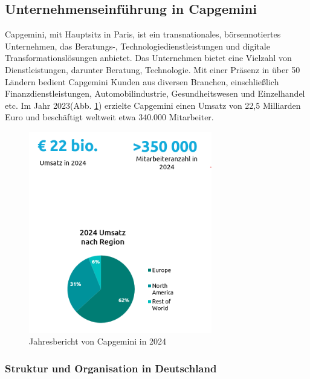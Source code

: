 \documentclass[a4paper, 12pt]{scrartcl}
\begin{document}
	\subsection{Unternehmenseinführung in Capgemini} %
	Capgemini, mit Hauptsitz in Paris, ist ein transnationales, börsennotiertes Unternehmen, das Beratungs-, Technologiedienstleistungen und digitale Transformationslösungen anbietet. Das Unternehmen bietet eine Vielzahl von Dienstleistungen, darunter Beratung, Technologie. Mit einer Präsenz in über 50 Ländern bedient Capgemini Kunden aus diversen Branchen, einschließlich Finanzdienstleistungen, Automobilindustrie, Gesundheitswesen und Einzelhandel etc. Im Jahr 2023(Abb. \ref{Stand von Capgemini}) erzielte Capgemini einen Umsatz von 22,5 Milliarden Euro und beschäftigt weltweit etwa 340.000 Mitarbeiter.
	\begin{figure}[h!]
		\begin{center}
			\includegraphics[width=8cm]{CApgemini zahlen.png}
			\caption{Jahresbericht von Capgemini in 2024\cite{Capgemini_allgemein}}
			\label{Stand von Capgemini}
		\end{center}
	\end{figure}
	\subsubsection{Struktur und Organisation in Deutschland}
	
\end{document}
